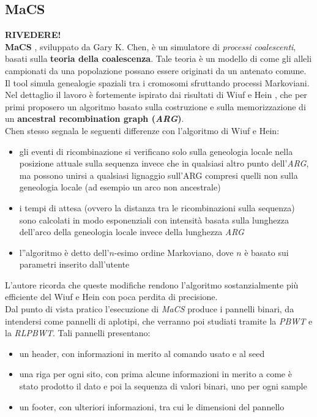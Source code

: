 \subsection{MaCS}
\textbf{RIVEDERE!}\\
\textbf{MaCS} \cite{macs}, sviluppato da Gary K. Chen, è un simulatore di
\textit{processi coalescenti}, basati sulla \textbf{teoria della
  coalescenza}. Tale teoria è un modello di come gli alleli campionati da una
popolazione possano essere originati da un antenato comune. Il tool simula
genealogie spaziali tra i cromosomi sfruttando processi Markoviani.\\
Nel dettaglio il lavoro è fortemente ispirato dai risultati di Wiuf e Hein
\cite{wiuf}, che per primi proposero un algoritmo basato sulla costruzione e
sulla memorizzazione di un \textbf{ancestral recombination graph
  (\textit{ARG})}.\\
Chen stesso segnala le seguenti differenze con l'algoritmo di Wiuf e Hein:
\begin{itemize}
  \item gli eventi di ricombinazione si verificano solo sulla geneologia locale
  nella posizione attuale sulla sequenza invece che in qualsiasi altro punto
  dell'\textit{ARG}, ma possono unirsi a qualsiasi lignaggio sull'ARG compresi
  quelli non sulla geneologia locale (ad esempio un arco non ancestrale)
  \item i tempi di attesa (ovvero la distanza tra le ricombinazioni sulla
  sequenza) sono calcolati in modo esponenziali con intensità basata sulla
  lunghezza dell'arco della geneologia locale invece della lunghezza
  \textit{ARG}
  \item l''algoritmo è detto dell'$n$-esimo ordine Markoviano, dove $n$ è basato
  sui parametri inserito dall'utente
\end{itemize}
L'autore ricorda che queste modifiche rendono l'algoritmo sostanzialmente più
efficiente del Wiuf e Hein con poca perdita di precisione. \\
Dal punto di vista pratico l'esecuzione di \textit{MaCS} produce i pannelli
binari, da intendersi come pannelli di aplotipi, che verranno poi studiati
tramite la \textit{PBWT} e la \textit{RLPBWT}. Tali pannelli presentano:
\begin{itemize}
  \item un header, con informazioni in merito al comando usato e al seed
  \item una riga per ogni sito, con prima alcune informazioni in merito a come è
  stato prodotto il dato e poi la sequenza di valori binari, uno per ogni sample
  \item un footer, con ulteriori informazioni, tra cui le dimensioni del
  pannello 
\end{itemize}
